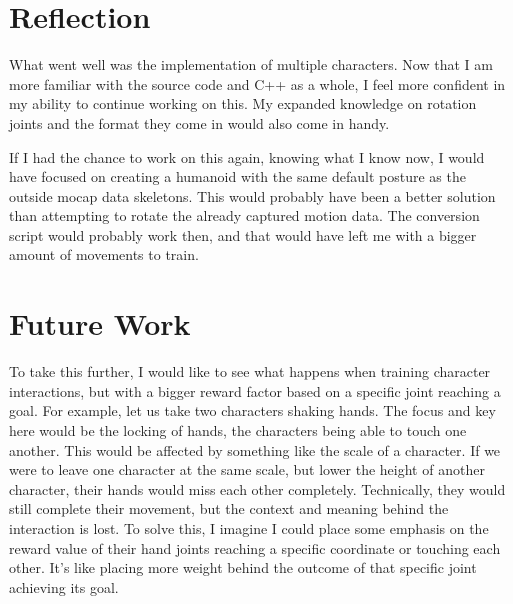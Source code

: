\documentclass{l4proj}
\begin{document}
\section{Reflection}
What went well was the implementation of multiple characters. Now that I am more familiar with the source code and C++ as a whole, I feel more confident in my ability to continue working on this. My expanded knowledge on rotation joints and the format they come in would also come in handy.

If I had the chance to work on this again, knowing what I know now, I would have focused on creating a humanoid with the same default posture as the outside mocap data skeletons. This would probably have been a better solution than attempting to rotate the already captured motion data. The conversion script would probably work then, and that would have left me with a bigger amount of movements to train.

\section{Future Work}
To take this further, I would like to see what happens when training character interactions, but with a bigger reward factor based on a specific joint reaching a goal. For example, let us take two characters shaking hands. The focus and key here would be the locking of hands, the characters being able to touch one another. This would be affected by something like the scale of a character. If we were to leave one character at the same scale, but lower the height of another character, their hands would miss each other completely. Technically, they would still complete their movement, but the context and meaning behind the interaction is lost. To solve this, I imagine I could place some emphasis on the reward value of their hand joints reaching a specific coordinate or touching each other. It's like placing more weight behind the outcome of that specific joint achieving its goal.

%
% 
\end{document}
